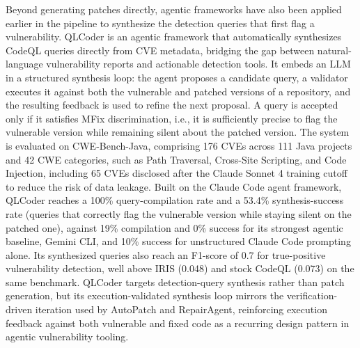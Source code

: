 Beyond generating patches directly, agentic frameworks have also been applied earlier in the pipeline to synthesize the detection queries that first flag a vulnerability.
QLCoder\cite{wang2026qlcoder} is an agentic framework that automatically synthesizes CodeQL queries directly from CVE metadata, bridging the gap between natural-language vulnerability reports and actionable detection tools.
It embeds an LLM in a structured synthesis loop: the agent proposes a candidate query, a validator executes it against both the vulnerable and patched versions of a repository, and the resulting feedback is used to refine the next proposal.
A query is accepted only if it satisfies MFix discrimination, i.e., it is sufficiently precise to flag the vulnerable version while remaining silent about the patched version. 
The system is evaluated on CWE-Bench-Java, comprising 176 CVEs across 111 Java projects and 42 CWE categories, such as Path Traversal, Cross-Site Scripting, and Code Injection, including 65 CVEs disclosed after the Claude Sonnet 4 training cutoff to reduce the risk of data leakage.
Built on the Claude Code agent framework, QLCoder reaches a 100\% query-compilation rate and a 53.4\% synthesis-success rate (queries that correctly flag the vulnerable version while staying silent on the patched one), against 19\% compilation and 0\% success for its strongest agentic baseline, Gemini CLI, and 10\% success for unstructured Claude Code prompting alone. 
Its synthesized queries also reach an F1-score of 0.7 for true-positive vulnerability detection, well above IRIS (0.048) and stock CodeQL (0.073) on the same benchmark.
QLCoder targets detection-query synthesis rather than patch generation, but its execution-validated synthesis loop mirrors the verification-driven iteration used by AutoPatch and RepairAgent, reinforcing execution feedback against both vulnerable and fixed code as a recurring design pattern in agentic vulnerability tooling.



